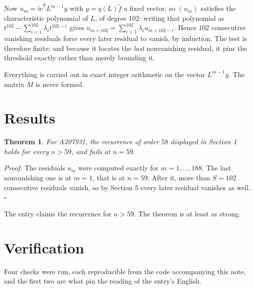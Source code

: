 \documentclass[11pt]{article}
\newtheorem{theorem}{Theorem}
\theoremstyle{definition}
\begin{document}
Now $u_m = \tilde w^{\mathsf T} L^{m-1} y$ with $y = q(L)\tilde f$ a fixed vector, so $(u_m)$ satisfies the characteristic polynomial of $L$, of degree $102$: writing that polynomial as $t^{102} - \sum_{i=1}^{102} \lambda_i t^{102-i}$ gives $u_{m+102} = \sum_{i=1}^{102} \lambda_i u_{m+102-i}$. Hence $102$ consecutive vanishing residuals force every later residual to vanish, by induction. The test is therefore finite; and because it locates the {\itshape last} nonvanishing residual, it pins the threshold exactly rather than merely bounding it.

Everything is carried out in exact integer arithmetic on the vector $L^{m-1}y$. The matrix $M$ is never formed.

\section{Results}

\begin{theorem} For A207931, the recurrence of order $58$ displayed in Section 1 holds for every $n > 59$, and fails at $n = 59$.\end{theorem}

{\itshape Proof.} The residuals $u_m$ were computed exactly for $m = 1,\dots,188$. The last nonvanishing one is at $m = 1$, that is at $n = 59$. After it, more than $S = 102$ consecutive residuals vanish, so by Section 5 every later residual vanishes as well. $\square$

The entry claims the recurrence for $n > 59$. The theorem is at least as strong.

\section{Verification}

Four checks were run, each reproducible from the code accompanying this note, and the first two are what pin the reading of the entry's English.
\end{document}
